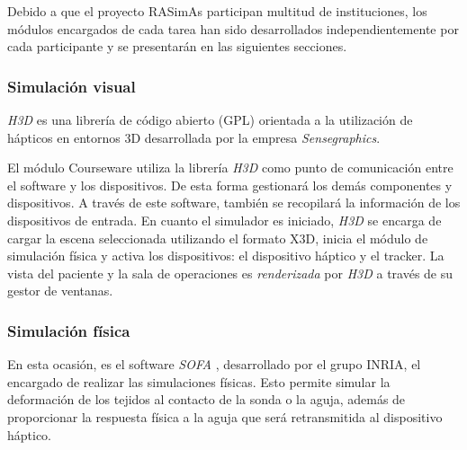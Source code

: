 
Debido a que el proyecto \ac{RASimAs} participan multitud de instituciones, los módulos encargados de cada tarea han sido desarrollados independientemente por cada participante y se presentarán en las siguientes secciones.


\subsubsection{Simulación visual}

\emph{H3D} \cite{sensegraphics2012open} es una librería de código abierto (\ac{GPL})  orientada a la utilización de hápticos en entornos 3D desarrollada por la empresa \emph{Sensegraphics}. 

El módulo \ac{Courseware} utiliza la librería \emph{H3D} como punto de comunicación entre el software y los dispositivos. De esta forma gestionará los demás componentes y dispositivos. A través de este software, también se recopilará la información de los dispositivos de entrada.
En cuanto el simulador es iniciado, \emph{H3D} se encarga de cargar la escena seleccionada utilizando el formato \ac{X3D}, inicia el módulo de simulación física y activa los dispositivos:  el dispositivo háptico y el \ac{tracker}. La vista del paciente y la sala de operaciones es \emph{renderizada} por \emph{H3D} a través de su gestor de ventanas.

\subsubsection{Simulación física}

En esta ocasión, es el software \emph{SOFA} \cite{sofaweb}, desarrollado por el grupo \ac{INRIA}, el encargado de realizar las simulaciones físicas. Esto permite simular la deformación de los tejidos al contacto de la sonda o la aguja, además de proporcionar la respuesta física a la aguja que será retransmitida al dispositivo háptico.

